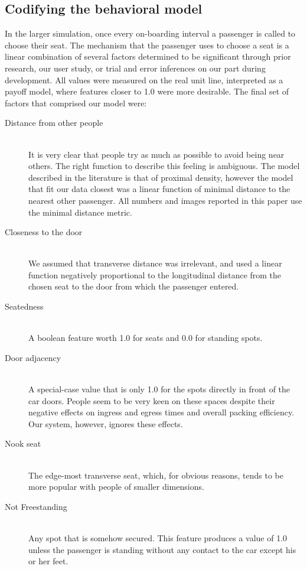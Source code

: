 \documentclass{acm_proc_article-sp}
\begin{document}
\subsection{Codifying the behavioral model}
In the larger simulation, once every on-boarding interval a passenger is called to choose their seat. The mechanism that the passenger uses to choose a seat is a linear combination of several factors determined to be significant through prior research\cite{evans2007crowding, hai1982sex, maines1979ecological}, our user study, or trial and error inferences on our part during development. All values were measured on the real unit line, interpreted as a payoff model, where features closer to 1.0 were more desirable. The final set of factors that comprised our model were:

\begin{description}
  \item[Distance from other people] \hfill \\
  It is very clear that people try as much as possible to avoid being near others. The right function to describe this feeling is ambiguous. The model described in the literature is that of proximal density\cite{evans2007crowding}, however the model that fit our data closest was a linear function of minimal distance to the nearest other passenger. All numbers and images reported in this paper use the minimal distance metric.
  \item[Closeness to the door] \hfill \\
  We assumed that transverse distance was irrelevant, and used a linear function negatively proportional to the longitudinal distance from the chosen seat to the door from which the passenger entered.
  \item[Seatedness] \hfill \\
  A boolean feature worth 1.0 for seats and 0.0 for standing spots.
  \item[Door adjacency] \hfill \\
  A special-case value that is only 1.0 for the spots directly in front of the car doors. People seem to be very keen on these spaces despite their negative effects on ingress and egress times and overall packing efficiency. Our system, however, ignores these effects.
  \item[Nook seat] \hfill \\
  The edge-most transverse seat, which, for obvious reasons, tends to be more popular with people of smaller dimensions.
  \item[Not Freestanding] \hfill \\
  Any spot that is somehow secured. This feature produces a value of 1.0 unless the passenger is standing without any contact to the car except his or her feet.
\end{description}
\end{document}

